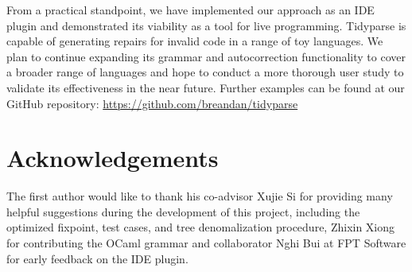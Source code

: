 \documentclass[sigplan,review,anonymous,acmsmall]{acmart}\settopmatter{printfolios=false,printccs=false,printacmref=false}
\begin{document}
    From a practical standpoint, we have implemented our approach as an IDE plugin and demonstrated its viability as a tool for live programming. Tidyparse is capable of generating repairs for invalid code in a range of toy languages. We plan to continue expanding its grammar and autocorrection functionality to cover a broader range of languages and hope to conduct a more thorough user study to validate its effectiveness in the near future. Further examples can be found at our GitHub repository: \url{https://github.com/breandan/tidyparse}

    \section{Acknowledgements}
    The first author would like to thank his co-advisor Xujie Si for providing many helpful suggestions during the development of this project, including the optimized fixpoint, test cases, and tree denomalization procedure, Zhixin Xiong for contributing the OCaml grammar and collaborator Nghi Bui at FPT Software for early feedback on the IDE plugin.
    
\end{document}
